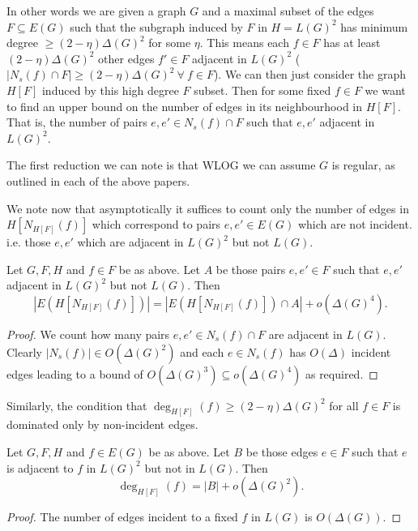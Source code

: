 In other words we are given a graph $G$ and a maximal subset of the edges $F \subseteq E(G)$
such that the subgraph induced by $F$ in $H=L(G)^2$ has minimum degree
$\geq (2-\eta)\Delta(G)^2$ for some $\eta$. This means each $f \in F$ has
at least $(2-\eta)\Delta(G)^2$ other edges $f' \in F$ adjacent in $L(G)^2$
($|N_s(f) \cap F| \geq (2-\eta)\Delta(G)^2\ \forall\ f \in F$).
We can then just consider the graph $H[F]$ induced by this high degree $F$ subset.
Then for some fixed $f \in F$ we want to find an upper bound on the number of edges
in its neighbourhood in $H[F]$. That is, the number of pairs $e, e' \in N_s(f) \cap F$ such
that $e, e'$ adjacent in $L(G)^2$.

\begin{note}
    The first reduction we can note is that WLOG we can assume $G$ is regular,
    as outlined in each of the above papers.
\end{note}

We note now that asymptotically it suffices to count only the number of edges
in $H[N_{H[F]}(f)]$ which correspond to pairs $e, e'\in E(G)$ which are not incident.
i.e. those $e,e'$ which are adjacent in $L(G)^2$ but not $L(G)$.
\begin{lemma}
    \label{lemma:count_non_incident_pairs}
    Let $G, F, H$ and $f\in F$ be as above. Let $A$ be those pairs $e,e'\in F$
    such that $e, e'$ adjacent in $L(G)^2$ but not $L(G)$.
    Then
    \[
        |E(H[N_{H[F]}(f)])| = |E(H[N_{H[F]}(f)]) \cap A| + o(\Delta(G)^4).
    \]
\end{lemma}
\begin{proof}
    We count how many pairs $e, e' \in N_s(f) \cap F$ are adjacent in $L(G)$.
    Clearly $|N_s(f)| \in O(\Delta(G)^2)$ and each $e \in N_s(f)$ has $O(\Delta)$
    incident edges leading to a bound of $O(\Delta(G)^3) \subseteq o(\Delta(G)^4)$
    as required.
\end{proof}

Similarly, the condition that $\deg_{H[F]}(f) \geq (2-\eta)\Delta(G)^2$ for all
$f\in F$ is dominated only by non-incident edges.
\begin{lemma}
    \label{lemma:sec_degree_non_incident}
    Let $G, F, H$ and $f\in E(G)$ be as above. Let $B$ be those edges $e\in F$
    such that $e$ is adjacent to $f$ in $L(G)^2$ but not in $L(G)$.
    Then
    \[
        \deg_{H[F]}(f) = |B| + o(\Delta(G)^2).
    \]
\end{lemma}
\begin{proof}
    The number of edges incident to a fixed $f$ in $L(G)$ is $O(\Delta(G))$.
\end{proof}


